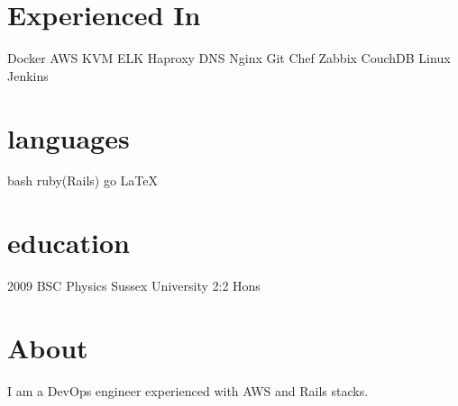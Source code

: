 \documentclass[]{friggeri-cv-a4}
\begin{document}

\begin{aside}
	\section{Experienced In}
    Docker
    AWS
    KVM
    ELK
    Haproxy
    DNS
    Nginx
    Git
    Chef
    Zabbix
    CouchDB
		Linux
		Jenkins
  \section{languages}
    bash
		ruby(Rails)
    go
    \LaTeX
  \section{education}
    2009 BSC Physics Sussex University 2:2 Hons
\end{aside}

\section{About}
I am a DevOps engineer experienced with AWS and Rails stacks.  
\end{document}
